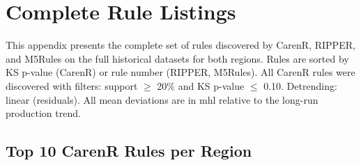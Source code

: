 
\chapter{Complete Rule Listings}\label{app:complete_rule_listings}

This appendix presents the complete set of rules discovered by CarenR, RIPPER, and M5Rules on the full historical datasets for both regions. Rules are sorted by KS p-value (CarenR) or rule number (RIPPER, M5Rules). All CarenR rules were discovered with filters: support $\geq$ 20\% and KS p-value $\leq$ 0.10. Detrending: linear (residuals). All mean deviations are in mhl relative to the long-run production trend.

\section{Top 10 CarenR Rules per Region}\label{app_sec:top10_carenr_rules}

